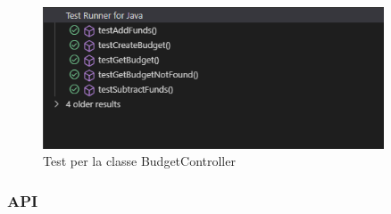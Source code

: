 \begin{figure}[H]
    \centering
    \includegraphics[width=0.9\textwidth]{images/BudgetControllerTest.png}
    \caption{Test per la classe BudgetController}
    \label{fig:BudgetControllerTest}
\end{figure}

\subsubsection{API}